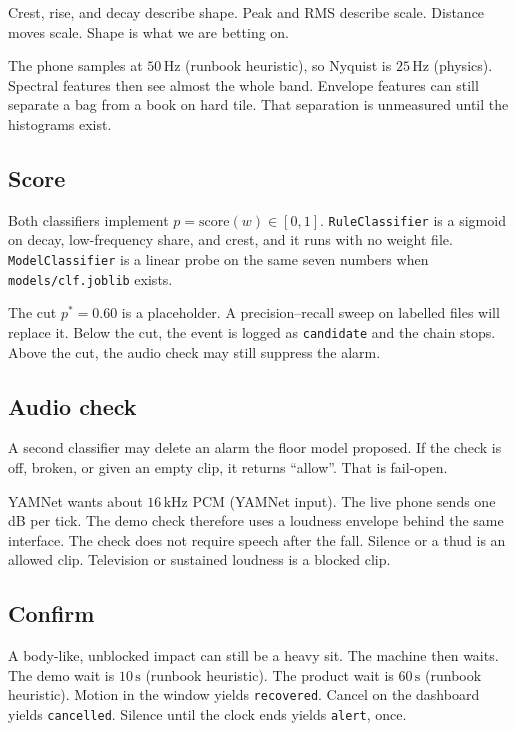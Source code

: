 \documentclass[11pt,a4paper]{article}
\newcommand{\src}[1]{\textnormal{\small (#1)}}
\begin{document}
Crest, rise, and decay describe shape. Peak and RMS describe scale. Distance moves scale. Shape is what we are betting on.

The phone samples at \(50\,\mathrm{Hz}\) \src{runbook heuristic}, so Nyquist is \(25\,\mathrm{Hz}\) \src{physics}. Spectral features then see almost the whole band. Envelope features can still separate a bag from a book on hard tile. That separation is unmeasured until the histograms exist.

\subsection{Score}

Both classifiers implement \(p=\mathrm{score}(w)\in[0,1]\). \texttt{RuleClassifier} is a sigmoid on decay, low-frequency share, and crest, and it runs with no weight file. \texttt{ModelClassifier} is a linear probe on the same seven numbers when \texttt{models/clf.joblib} exists.

The cut \(p^*=0.60\) is a placeholder. A precision--recall sweep on labelled files will replace it. Below the cut, the event is logged as \texttt{candidate} and the chain stops. Above the cut, the audio check may still suppress the alarm.

\subsection{Audio check}

A second classifier may delete an alarm the floor model proposed. If the check is off, broken, or given an empty clip, it returns ``allow''. That is fail-open.

YAMNet wants about \(16\,\mathrm{kHz}\) PCM \src{YAMNet input}. The live phone sends one dB per tick. The demo check therefore uses a loudness envelope behind the same interface. The check does not require speech after the fall. Silence or a thud is an allowed clip. Television or sustained loudness is a blocked clip.

\subsection{Confirm}

A body-like, unblocked impact can still be a heavy sit. The machine then waits. The demo wait is \(10\,\mathrm{s}\) \src{runbook heuristic}. The product wait is \(60\,\mathrm{s}\) \src{runbook heuristic}. Motion in the window yields \texttt{recovered}. Cancel on the dashboard yields \texttt{cancelled}. Silence until the clock ends yields \texttt{alert}, once.
\end{document}
